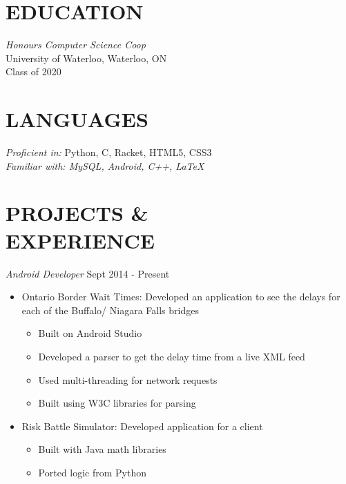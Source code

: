 \documentclass[margin]{res}
\begin{document}
\begin{resume} 

\section{EDUCATION} {\sl Honours Computer Science Coop}  \\
                University of Waterloo, Waterloo, ON \\
                Class of 2020 \\
                
 
\section{LANGUAGES} {\sl Proficient in:} Python, C, Racket, HTML5, CSS3 \\
{\sl Familiar with: MySQL, Android, C++, \space \LaTeX} 
 
				
\section{PROJECTS \& \\ EXPERIENCE} {\sl Android Developer} \hfill Sept 2014 - Present                
                 \begin{itemize}  \itemsep -2pt %
                 \item Ontario Border Wait Times:
                 Developed an application to see the delays for each of the Buffalo/ Niagara Falls bridges
                 	\begin{itemize} \itemsep -1pt
    				\item Built on Android Studio  
    				\item Developed a parser to get the delay time from a live  XML feed
    				\item Used multi-threading for network requests
    				\item Built using W3C libraries for parsing
					\end{itemize}
                \item Risk Battle Simulator: Developed application for a client
                	\begin{itemize}  \itemsep -1pt
                	\item Built with Java math libraries
                	\item Ported logic from Python
					\end{itemize}	                	  
                \end{itemize}
                

\end{resume}
\end{document}
